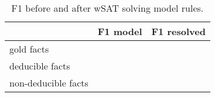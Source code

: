 \begin{table*}
\begin{tabular}{ l|c|c} 
& F1 model & F1 resolved \\\hline
gold facts & \\\hline
deducible facts& \\\hline
non-deducible facts&& \\\hline

\end{tabular}
\caption{F1 before and after wSAT solving model rules.}
\end{table*}